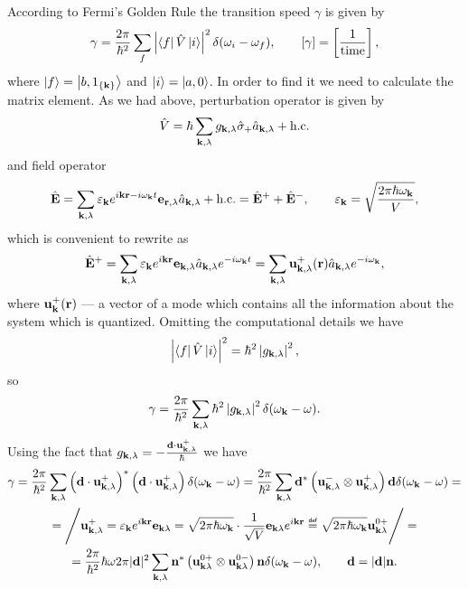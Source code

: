 According to Fermi's Golden Rule the transition speed $\gamma$ is given by
\begin{equation}
	\gamma = \frac{2\pi}{\hbar^2} \sum_{f} \left| \left\langle {f} \right\rvert \hat{V} \left\lvert {i} \right\rangle \right|^2 \delta(\omega_i - \omega_f),	\qquad \left[\gamma\right] = \left[\frac{1}{\text{time}}\right],
\end{equation}
where $\left\lvert {f} \right\rangle =\left\lvert {b, 1_{\left\{ \mathbf{k}\right\}}} \right\rangle$ and $\left\lvert {i} \right\rangle = \left\lvert {a,0} \right\rangle$. In order to find it we need to calculate the matrix element. As we had above, perturbation operator is given by
\begin{equation}
	\hat{V} = \hbar \sum_{\mathbf{k}, \lambda} g_{\mathbf{k}, \lambda} \hat{\sigma}_+ \hat{a}_{\mathbf{k}, \lambda} + \text{h.c.}
\end{equation}
and field operator 
\begin{equation}
	\hat{\mathbf{E}} = \sum_{\mathbf{k}, \lambda} \varepsilon_{\mathbf{k}} e^{i \mathbf{k} \mathbf{r} - i \omega_{\mathbf{k}}t} \mathbf{e}_{\mathbf{r}, \lambda} \hat{a}_{\mathbf{k}, \lambda} + \text{h.c.} = \hat{\mathbf{E}}^+ + \hat{\mathbf{E}}^-, \qquad \varepsilon_{\mathbf{k}} = \sqrt{\frac{2 \pi \hbar \omega_{\mathbf{k}}}{V}},
\end{equation}
which is convenient to rewrite as 
\begin{equation}
	\hat{\mathbf{E}}^+ = \sum_{\mathbf{k}, \lambda} \varepsilon_{\mathbf{k}} e^{i\mathbf{k} \mathbf{r}} \mathbf{e}_{\mathbf{k} , \lambda} \hat{a}_{\mathbf{k}, \lambda} e^{-i\omega_{\mathbf{k}} t} = \sum_{\mathbf{k}, \lambda} \mathbf{u}_{\mathbf{k}, \lambda}^+(\mathbf{r}) \hat{a}_{\mathbf{k}, \lambda} e^{-i\omega_{\mathbf{k}}},
\end{equation}
where $\mathbf{u}_{\mathbf{k}}^+(\mathbf{r})$ --- a vector of a mode which contains all the information about the system which is quantized. Omitting the computational details we have
\begin{equation}
	\left| \left\langle {f} \right\rvert \hat{V} \left\lvert {i} \right\rangle \right|^2 =  \hbar^2 \left| g_{\mathbf{k}, \lambda} \right|^2 ,
\end{equation}
so
\begin{equation}
	\gamma = \frac{2\pi}{\hbar^2} \sum_{\mathbf{k}, \lambda} \hbar^2 \left| g_{\mathbf{k}, \lambda} \right|^2 \delta(\omega_{\mathbf{k}} - \omega).
\end{equation}
Using the fact that $g_{\mathbf{k}, \lambda} = - \frac{\mathbf{d} \cdot \mathbf{u}^+_{\mathbf{k}, \lambda}}{\hbar}$ we have
\begin{multline}
	\gamma = \frac{2\pi}{\hbar^2} \sum_{\kv, \lambda} \left( \vec{d} \cdot \vec{u}_{\kv, \lambda}^+ \right)^* \left( \vec{d} \cdot \vec{u}_{\kv, \lambda}^+ \right) \delta(\omega_{\kv} - \omega) = \frac{2\pi}{\hbar^2} \sum_{\kv, \lambda} \vec{d}^* \left(\vec{u}_{\kv, \lambda}^- \otimes  \vec{u}_{\kv, \lambda}^+ \right) \vec{d} \delta(\omega_{\kv} - \omega)= \\ =
	\Bigg/ \vec{u}^+_{\vec{k}, \lambda} = \varepsilon_{\kv} e^{i \vec{k} \vec{r}} \vec{e}_{\kv \lambda} =  \sqrt{2\pi \hbar \omega_{\kv}} \cdot \frac{1}{\sqrt{V}} \vec{e}_{\kv \lambda} e^{i \kv \vec{r}} \myeq \sqrt{2\pi \hbar \omega_{\kv}} \vec{u}^{0+}_{\kv \lambda} \Bigg/ =  \\ = \frac{2\pi}{\hbar^2} \hbar \omega 2 \pi  |\vec{d}|^2 \sum_{\kv, \lambda} \vec{n}^* \left( \vec{u}^{0+}_{\kv \lambda} \otimes \vec{u}^{0-}_{\kv \lambda} \right) \vec{n} \delta (\omega_{\kv} - \omega) , \qquad \vec{d} = |\vec{d}| \vec{n}.
\end{multline}
